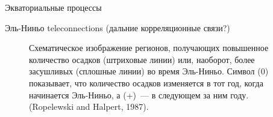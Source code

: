 \begin{chapter}{Экваториальные процессы}
\begin{section}{Эль-Ниньо teleconnections (дальние корреляционные связи?)}
\begin{figure}[t!]
\caption{Схематическое изображение регионов, получающих повышенное количество 
осадков (штриховые линии) или, наоборот, более засушливых (сплошные линии) во
время Эль-Ниньо. Символ (0) показывает, что количество осадков
изменяется в тот год, когда начинается Эль-Ниньо, а (+)~--- в следующем за 
ним году. 
(Ropelewski and Halpert, 1987).}
\label{fig:teleconnections}
\end{figure}
%


\end{section}
\end{chapter}
